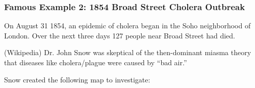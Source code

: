 \documentclass[handout]{beamer}
\newcommand{\blue}[1]{\textcolor{blue2}{#1}}
\begin{document}
%
%
%
%
%


\begin{frame}
\frametitle{Famous Example 2:  1854 Broad Street Cholera Outbreak}

On August 31 1854, an epidemic of cholera began in the Soho neighborhood of London.  Over the next three days 127 people near Broad Street had died.

\vspace{0.25cm}

\pause (Wikipedia) Dr. John Snow was skeptical of the then-dominant \blue{miasma theory} that diseases like cholera/plague were caused by  ``bad air.'' 

\vspace{0.25cm}

\pause Snow created the following map to investigate:

\end{frame}
\end{document}
